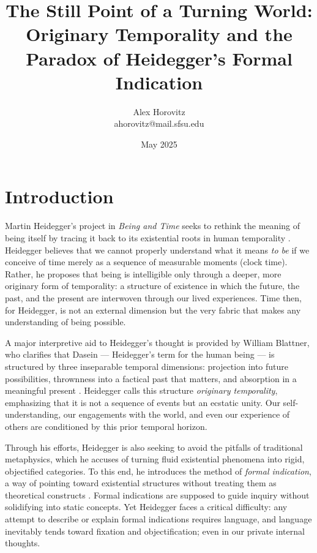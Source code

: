 \documentclass{article}
\title{The Still Point of a Turning World: Originary Temporality and the Paradox of Heidegger's Formal Indication}
\author{Alex Horovitz \\ \small ahorovitz@mail.sfsu.edu}
\date{May 2025}
\begin{document}
\setlength{\parskip}{0.75em}

\maketitle

\section*{Introduction}

Martin Heidegger's project in \textit{Being and Time} seeks to rethink the meaning of being itself by tracing it back to its existential roots in human temporality \parencite[p.~34]{heidegger1962}. Heidegger believes that we cannot properly understand what it means \textit{to be} if we conceive of time merely as a sequence of measurable moments (clock time). Rather, he proposes that being is intelligible only through a deeper, more originary form of temporality: a structure of existence in which the future, the past, and the present are interwoven through our lived experiences. Time then, for Heidegger, is not an external dimension but the very fabric that makes any understanding of being possible.

A major interpretive aid to Heidegger's thought is provided by William Blattner, who clarifies that Dasein --- Heidegger's term for the human being --- is structured by three inseparable temporal dimensions: projection into future possibilities, thrownness into a factical past that matters, and absorption in a meaningful present \parencite[pp.~311--312]{blattner2007}. Heidegger calls this structure \textit{originary temporality}, emphasizing that it is not a sequence of events but an ecstatic unity. Our self-understanding, our engagements with the world, and even our experience of others are conditioned by this prior temporal horizon.

Through his efforts, Heidegger is also seeking to avoid the pitfalls of traditional metaphysics, which he accuses of turning fluid existential phenomena into rigid, objectified categories. To this end, he introduces the method of \textit{formal indication}, a way of pointing toward existential structures without treating them as theoretical constructs \parencite[p.~782]{dahlstrom1994}. Formal indications are supposed to guide inquiry without solidifying into static concepts. Yet Heidegger faces a critical difficulty: any attempt to describe or explain formal indications requires language, and language inevitably tends toward fixation and objectification; even in our private internal thoughts.
\end{document}
